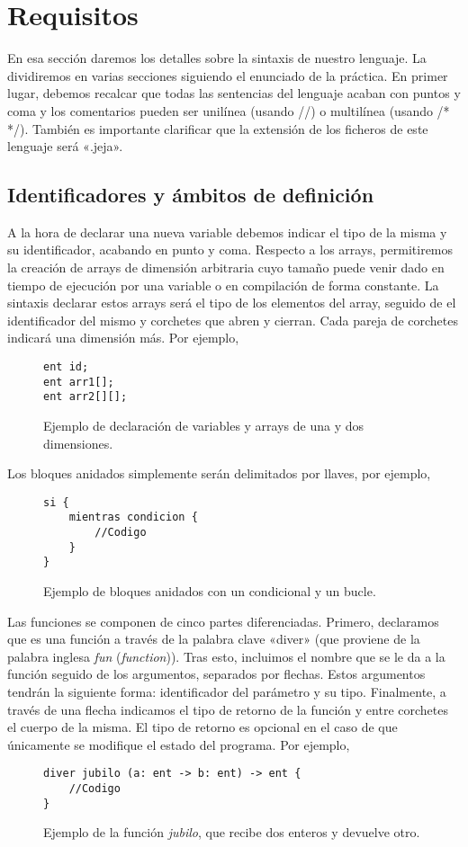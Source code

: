 \chapter*{Requisitos}
En esa sección daremos los detalles sobre la sintaxis de nuestro lenguaje. La
dividiremos en varias secciones siguiendo el enunciado de la práctica. En primer
lugar, debemos recalcar que todas las sentencias del lenguaje acaban con puntos
y coma y los comentarios pueden ser unilínea (usando //) o multilínea (usando /*
*/). También es importante clarificar que la extensión de los ficheros de este
lenguaje será «.jeja».
\section*{Identificadores y ámbitos de definición}
A la hora de declarar una nueva variable debemos indicar el tipo de la misma y
su identificador, acabando en punto y coma. Respecto a los arrays,
permitiremos la creación de arrays de dimensión arbitraria cuyo tamaño puede
venir dado en tiempo de ejecución por una variable o en compilación de forma
constante. La sintaxis declarar estos arrays será el tipo de los elementos del
array, seguido de el identificador del mismo y corchetes que abren y cierran.
Cada pareja de corchetes indicará una dimensión más.
Por ejemplo,
\begin{figure}[H]
    \centering
    \begin{lstlisting}
ent id;
ent arr1[];
ent arr2[][];
    \end{lstlisting}
    \caption{Ejemplo de declaración de variables y arrays de una y dos
    dimensiones.}
\end{figure}

Los bloques anidados simplemente serán delimitados por llaves, por ejemplo,
\begin{figure}[H]
    \centering
    \begin{lstlisting}
si {
    mientras condicion {
        //Codigo
    }
}
    \end{lstlisting}
    \caption{Ejemplo de bloques anidados con un condicional y un bucle.}
\end{figure}

Las funciones se componen de cinco partes diferenciadas. Primero, declaramos que
es una función a través de la palabra clave «diver» (que proviene de la palabra
inglesa \textit{fun} (\textit{function})). Tras esto, incluimos el nombre que se
le da a la función seguido de los argumentos, separados por flechas. Estos
argumentos tendrán la siguiente forma: identificador del parámetro y su tipo.
Finalmente, a través de una flecha indicamos el tipo de retorno de la función y
entre corchetes el cuerpo de la misma. El tipo de retorno es opcional en el caso
de que únicamente se modifique el estado del programa. Por ejemplo,
\begin{figure}[H]
    \centering
    \begin{lstlisting}
diver jubilo (a: ent -> b: ent) -> ent {
    //Codigo
}
    \end{lstlisting}
    \caption{Ejemplo de la función \textit{jubilo}, que recibe dos enteros y
    devuelve otro.}
\end{figure}

